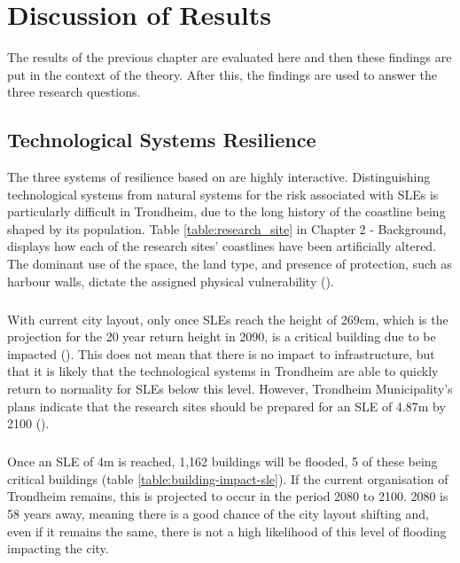 

\chapter{Discussion of Results}
The results of the previous chapter are evaluated here and then these findings are put in the context of the theory. After this, the findings are used to answer the three research questions. 



\section{Technological Systems Resilience}\label{tech-resilience-discussion}
The three systems of resilience based on \cite{cutter_place-based_2008} are highly interactive. Distinguishing technological systems from natural systems for the risk associated with SLEs is particularly difficult in Trondheim, due to the long history of the coastline being shaped by its population. Table \ref{table:research_site} in Chapter 2 - Background, displays how each of the research sites' coastlines have been artificially altered. The dominant use of the space, the land type, and presence of protection, such as harbour walls, dictate the assigned physical vulnerability (\cite{opach_seeking_2020}).
\paragraph{}

With current city layout, only once SLEs reach the height of 269cm, which is the projection for the 20 year return height in 2090, is a critical building due to be impacted (\cite{kartverket_se_2020}). This does not mean that there is no impact to infrastructure, but that it is likely that the technological systems in Trondheim are able to quickly return to normality for SLEs below this level. However, Trondheim Municipality's plans indicate that the research sites should be prepared for an SLE  of 4.87m by 2100 (\cite{hanssen_saksframlegg_2013}).
\paragraph{}
Once an SLE of 4m is reached, 1,162 buildings will be flooded, 5 of these being critical buildings (table \ref{table:building-impact-sle}). If the current organisation of Trondheim remains, this is projected to occur in the period 2080 to 2100. 2080 is 58 years away, meaning there is a good chance of the city layout shifting and, even if it remains the same, there is not a high likelihood of this level of flooding impacting the city.  
